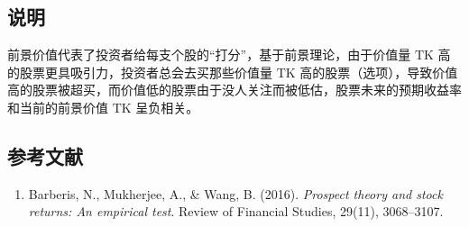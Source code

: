 \documentclass{article}
\begin{document}
\subsection{说明}
前景价值代表了投资者给每支个股的“打分”，基于前景理论，由于价值量 \( \mathrm{TK} \) 高的股票更具吸引力，投资者总会去买那些价值量 \( \mathrm{TK} \) 高的股票（选项），导致价值高的股票被超买，而价值低的股票由于没人关注而被低估，股票未来的预期收益率和当前的前景价值 \( \mathrm{TK} \) 呈负相关。

\subsection{参考文献}
\begin{enumerate}
    \item Barberis, N., Mukherjee, A., \& Wang, B. (2016). \textit{Prospect theory and stock returns: An empirical test}. Review of Financial Studies, 29(11), 3068–3107.
\end{enumerate}
\end{document}

